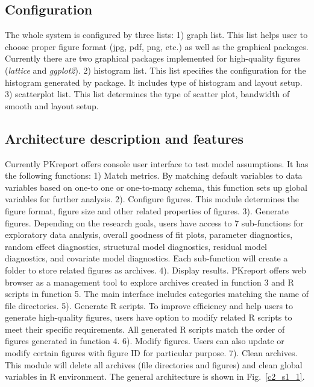 \documentclass[a4paper]{article}
\begin{document}
\subsection{Configuration}

The whole system is configured by three lists: 1) graph list. This list helps user to choose proper figure format (jpg, pdf, png, etc.) as well as the graphical packages. Currently there are two graphical packages implemented for high-quality figures (\textit{lattice} and \textit{ggplot2}). 2) histogram list. This list specifies the configuration for the histogram generated by package. It includes type of histogram and layout setup. 3) scatterplot list. This list determines the type of scatter plot, bandwidth of smooth and layout setup.

\subsection{Architecture description and features}

Currently PKreport offers console user interface to test model assumptions. It has the following functions: 1) Match metrics. By matching default variables to data variables based on one-to one or one-to-many schema, this function sets up global variables for further analysis. 2). Configure figures. This module determines the figure format, figure size and other related properties of figures. 3). Generate figures. Depending on the research goals, users have access to 7 sub-functions for exploratory data analysis, overall goodness of fit plots, parameter diagnostics, random effect diagnostics, structural model diagnostics, residual model diagnostics, and covariate model diagnostics. Each sub-function will create a folder to store related figures as archives. 4). Display results. PKreport offers web browser as a management tool to explore archives created in function 3 and R scripts in function 5. The main interface includes categories matching the name of file directories. 5). Generate R scripts. To improve
efficiency and help users to generate high-quality figures, users have option to modify
related R scripts to meet their specific requirements. All generated R scripts match the order of figures generated in function 4. 6). Modify figures. Users can also update or modify certain figures with figure ID for particular purpose. 7). Clean archives. This module will delete all archives (file directories and figures) and clean global variables in R environment. The general architecture is shown in Fig.~\ref{c2_s1_1}.
\end{document}
